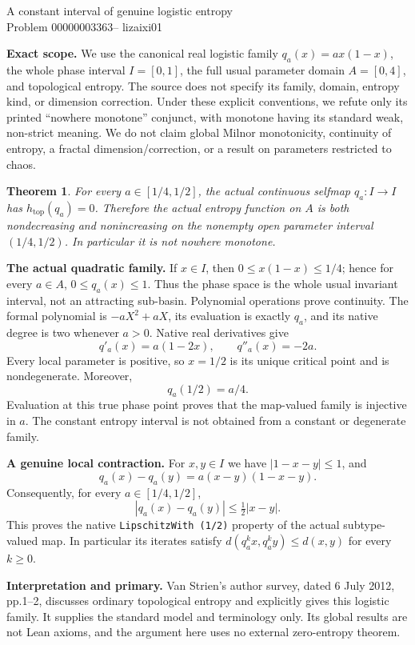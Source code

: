 \documentclass[11pt,a4paper]{article}
\newtheorem{theorem}{Theorem}
\newcommand{\h}{h_{\mathrm{top}}}
\begin{document}
\begin{center}
{\Large A constant interval of genuine logistic entropy}\\[5pt]
{\large Problem 00000003363}\quad -- \quad lizaixi01
\end{center}

\textbf{Exact scope.} We use the canonical real logistic family
\(q_a(x)=ax(1-x)\), the whole phase interval \(I=[0,1]\), the full usual
parameter domain \(A=[0,4]\), and topological entropy. The source does not
specify its family, domain, entropy kind, or dimension correction. Under these
explicit conventions, we refute only its printed ``nowhere monotone''
conjunct, with monotone having its standard weak, non-strict meaning. We do
not claim global Milnor monotonicity, continuity of entropy, a fractal
dimension/correction, or a result on parameters restricted to chaos.

\begin{theorem}
For every \(a\in[1/4,1/2]\), the actual continuous selfmap
\(q_a:I\to I\) has \(\h(q_a)=0\). Therefore the actual entropy function on
\(A\) is both nondecreasing and nonincreasing on the nonempty open parameter
interval \((1/4,1/2)\). In particular it is not nowhere monotone.
\end{theorem}

\textbf{The actual quadratic family.}
If \(x\in I\), then \(0\le x(1-x)\le1/4\); hence for every \(a\in A\),
\(0\le q_a(x)\le1\). Thus the phase space is the whole usual invariant
interval, not an attracting sub-basin. Polynomial operations prove continuity.
The formal polynomial is \(-aX^2+aX\), its evaluation is exactly \(q_a\),
and its native degree is two whenever \(a>0\). Native real derivatives give
\[
 q'_a(x)=a(1-2x),\qquad q''_a(x)=-2a.
\]
Every local parameter is positive, so \(x=1/2\) is its unique critical point
and is nondegenerate. Moreover,
\[
 q_a(1/2)=a/4.
\]
Evaluation at this true phase point proves that the map-valued family is
injective in \(a\). The constant entropy interval is not obtained from a
constant or degenerate family.

\textbf{A genuine local contraction.}
For \(x,y\in I\) we have \(|1-x-y|\le1\), and
\[
 q_a(x)-q_a(y)=a(x-y)(1-x-y).
\]
Consequently, for every \(a\in[1/4,1/2]\),
\[
 |q_a(x)-q_a(y)|\le\tfrac12|x-y|.
\]
This proves the native \texttt{LipschitzWith (1/2)} property of the actual
subtype-valued map. In particular its iterates satisfy
\(d(q_a^k x,q_a^k y)\le d(x,y)\) for every \(k\ge0\).

\textbf{Interpretation and primary.}
Van Strien's author survey, dated 6 July 2012, pp.1--2, discusses ordinary
topological entropy and explicitly gives this logistic family. It supplies
the standard model and terminology only. Its global results are not Lean
axioms, and the argument here uses no external zero-entropy theorem.
\end{document}
